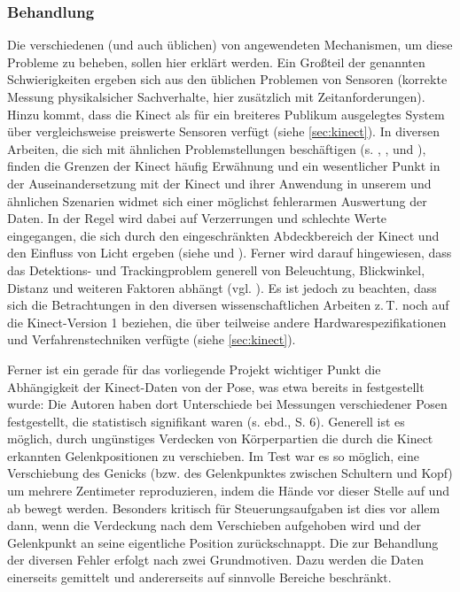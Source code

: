 	\subsubsection{Behandlung}
	Die verschiedenen (und auch üblichen) von angewendeten Mechanismen, um diese Probleme zu beheben, sollen hier erklärt werden. Ein Großteil der genannten Schwierigkeiten ergeben sich aus den üblichen Problemen von Sensoren (korrekte Messung physikalsicher Sachverhalte, hier zusätzlich mit Zeitanforderungen). Hinzu kommt, dass die Kinect als für ein breiteres Publikum ausgelegtes System über vergleichsweise preiswerte Sensoren verfügt (siehe \ref{sec:kinect}). In diversen Arbeiten, die sich mit ähnlichen Problemstellungen beschäftigen (s. \cite{biomid}, \cite{bodyprop}, \cite{kinectlight} und \cite{thermalsens}), finden die Grenzen der Kinect häufig Erwähnung und ein wesentlicher Punkt in der Auseinandersetzung mit der Kinect und ihrer Anwendung in unserem und ähnlichen Szenarien widmet sich einer möglichst fehlerarmen Auswertung der Daten. In der Regel wird dabei auf Verzerrungen und schlechte Werte eingegangen, die sich durch den eingeschränkten \glqq Abdeckbereich\grqq{} der Kinect und den Einfluss von Licht ergeben (siehe \cite{bodyprop} und \cite{kinectlight}). Ferner wird darauf hingewiesen, dass das Detektions- und Trackingproblem generell von Beleuchtung, Blickwinkel, Distanz und weiteren Faktoren abhängt (vgl. \cite{thermalsens}). Es ist jedoch zu beachten, dass sich die Betrachtungen in den diversen wissenschaftlichen Arbeiten z.\,T. noch auf die Kinect-Version 1 beziehen, die über teilweise andere Hardwarespezifikationen und Verfahrenstechniken verfügte (siehe \ref{sec:kinect}).\par
	Ferner ist ein gerade für das vorliegende Projekt wichtiger Punkt die Abhängigkeit der Kinect-Daten von der Pose, was etwa bereits in \cite{biomid} festgestellt wurde: Die Autoren haben dort Unterschiede bei Messungen verschiedener Posen festgestellt, die statistisch signifikant waren (s. ebd., S. 6). Generell ist es möglich, durch ungünstiges Verdecken von Körperpartien die durch die Kinect erkannten Gelenkpositionen zu verschieben. Im Test war es so möglich, eine Verschiebung des Genicks (bzw. des Gelenkpunktes zwischen Schultern und Kopf) um mehrere Zentimeter reproduzieren, indem die Hände vor dieser Stelle auf und ab bewegt werden. Besonders kritisch für Steuerungsaufgaben ist dies vor allem dann, wenn die Verdeckung nach dem Verschieben aufgehoben wird und der Gelenkpunkt an seine eigentliche Position \glqq zurückschnappt\grqq{}. Die zur Behandlung der diversen Fehler erfolgt nach zwei Grundmotiven. Dazu werden die Daten einerseits gemittelt und andererseits auf sinnvolle Bereiche beschränkt.
